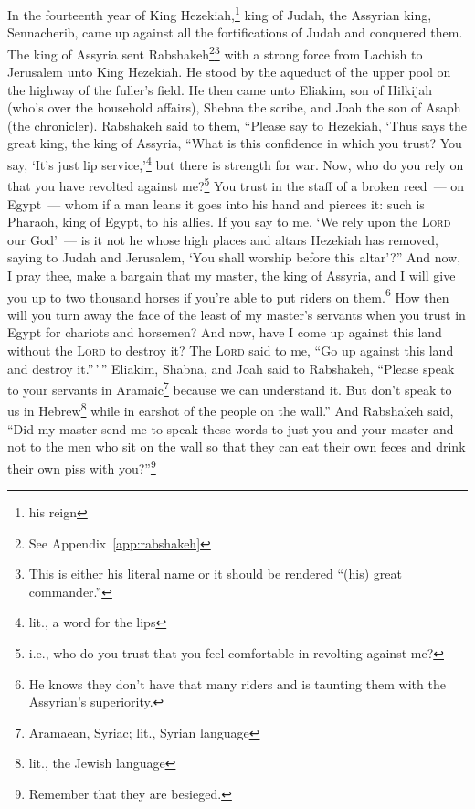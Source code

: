 
\begin{enumerate*}[mode=unboxed]
     In the fourteenth year of King Hezekiah,\footnote{his reign} king of Judah, the Assyrian king, Sennacherib, came up against all the fortifications of Judah and conquered them.%
     The king of Assyria sent Rabshakeh\footnote{See Appendix~\ref{app:rabshakeh}}\footnote{This is either his literal name or it should be rendered ``(his) great commander.''} with a strong force from Lachish to Jerusalem unto King Hezekiah. He stood by the aqueduct of the upper pool on the highway of the fuller's field.%
     He then came unto Eliakim, son of Hilkijah (who's over the household affairs), Shebna the scribe, and Joah the son of Asaph (the chronicler).%
     Rabshakeh said to them, ``Please say to Hezekiah, `Thus says the great king, the king of Assyria, ``What is this confidence in which you trust?%
     You say, `It's just lip service,'\footnote{lit., a word for the lips} but there is strength for war. Now, who do you rely on that you have revolted against me?\footnote{i.e., who do you trust that you feel comfortable in revolting against me?}%
     You trust in the staff of a broken reed~--- on Egypt~--- whom if a man leans it goes into his hand and pierces it: such is Pharaoh, king of Egypt, to his allies.%
     If you say to me, `We rely upon the \textsc{Lord} our God'~--- is it not he whose high places and altars Hezekiah has removed, saying to Judah and Jerusalem, `You shall worship before this altar'?''%
     And now, I pray thee, make a bargain that my master, the king of Assyria, and I will give you up to two thousand horses if you're able to put riders on them.\footnote{He knows they don't have that many riders and is taunting them with the Assyrian's superiority.}%
     How then will you turn away the face of the least of my master's servants when you trust in Egypt for chariots and horsemen?%
     And now, have I come up against this land without the \textsc{Lord} to destroy it? The \textsc{Lord} said to me, ``Go up against this land and destroy it.''\,'\,''%
     Eliakim, Shabna, and Joah said to Rabshakeh, ``Please speak to your servants in Aramaic\footnote{Aramaean, Syriac; lit., Syrian language} because we can understand it. But don't speak to us in Hebrew\footnote{lit., the Jewish language} while in earshot of the people on the wall.''%
     And Rabshakeh said, ``Did my master send me to speak these words to just you and your master and not to the men who sit on the wall so that they can eat their own feces and drink their own piss with you?''\footnote{Remember that they are besieged.}%

\end{enumerate*}
